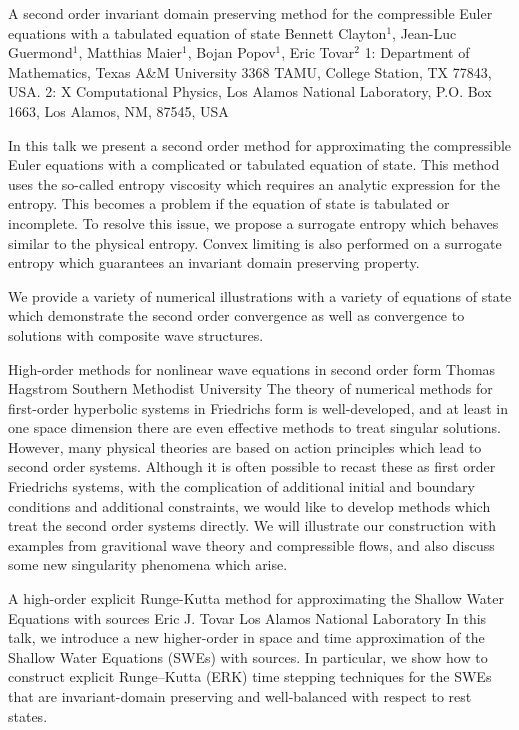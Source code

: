 \vspace{1.5ex}
\abs
{A second order invariant domain preserving method for the compressible Euler equations with a tabulated equation of state}
{Bennett Clayton$^{1}$, Jean-Luc Guermond$^{1}$, Matthias Maier$^{1}$, Bojan Popov$^{1}$, Eric Tovar$^{2}$}
{1: Department of Mathematics, Texas A\&M University 3368 TAMU, College Station, TX 77843, USA. 2: X Computational Physics, Los Alamos National Laboratory, P.O. Box 1663, Los Alamos, NM, 87545, USA}
{In this talk we present a second order method for approximating the compressible Euler equations with a complicated or tabulated equation of state. This method uses the so-called entropy viscosity which requires an analytic expression for the entropy. This becomes a problem if the equation of state is tabulated or incomplete. To resolve this issue, we propose a surrogate entropy which behaves similar to the physical entropy. Convex limiting is also performed on a surrogate entropy which guarantees an invariant domain preserving property.
	
We provide a variety of numerical illustrations with a variety of equations of state which demonstrate the second order convergence as well as convergence to solutions with composite wave structures.}


\vspace{1.5ex}
\abs
{High-order methods for nonlinear wave equations in second order form}
{Thomas Hagstrom}
{Southern Methodist University}
{The theory of numerical methods for first-order hyperbolic systems in Friedrichs form is well-developed, and at least in one space dimension there are even effective methods to treat singular solutions. However, many physical theories are based on action principles which lead to second order systems. Although it is often possible to recast these as first order Friedrichs systems, with the complication of additional initial and boundary conditions and additional constraints, we would like to develop methods which treat the second order systems directly. We will illustrate our construction with examples from gravitional wave theory and compressible flows, and also discuss some new singularity phenomena which arise.}


\vspace{1.5ex}
\abs
{A high-order explicit Runge-Kutta method for approximating the Shallow Water Equations with sources}
{Eric J. Tovar}
{Los Alamos National Laboratory}
{In this talk, we introduce a new higher-order in space and time approximation of the Shallow Water Equations (SWEs) with sources. In particular, we show how to construct explicit Runge–Kutta (ERK) time stepping techniques for the SWEs that are invariant-domain preserving and well-balanced with respect to rest states.}


